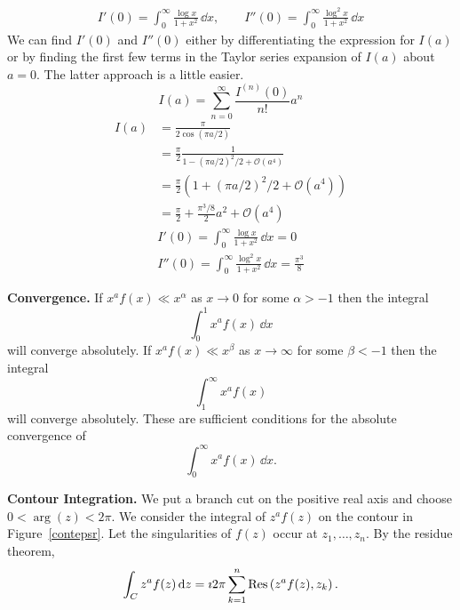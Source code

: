 {\begin{Solution}
\begin{enumerate}
\begin{gather*}
      I'(0) = \int_0^\infty \frac{\log x}{1+x^2}\,\dd x, \qquad
      I''(0) = \int_0^\infty \frac{\log^2 x}{1+x^2}\,\dd x
    \end{gather*}
    We can find $I'(0)$ and $I''(0)$ either by differentiating the
    expression for $I(a)$ or by finding the first few terms in the
    Taylor series expansion of $I(a)$ about $a = 0$.  The latter approach
    is a little easier.
    \[
    I(a) = \sum_{n = 0}^\infty \frac{ I^{(n)}(0) }{ n! } a^n
    \]
    \begin{align*}
      I(a)    &= \frac{\pi}{2 \cos(\pi a / 2)} \\
      &= \frac{\pi}{2} \frac{ 1 }
      { 1 - (\pi a / 2)^2 / 2 + \mathcal{O}( a^4 ) } \\
      &= \frac{\pi}{2} 
      \left( 1 + (\pi a / 2)^2 / 2 + \mathcal{O}( a^4 ) \right) \\
      &= \frac{\pi}{2} + \frac{ \pi^3 / 8 }{2} a^2 
      + \mathcal{O}( a^4 )
    \end{align*}
    \begin{gather*}
      \boxed{
        I'(0) = \int_0^\infty \frac{\log x}{1+x^2} \,\dd x = 0
        } \\
      \boxed{
        I''(0) = \int_0^\infty \frac{\log^2 x}{1+x^2} \,\dd x = \frac{\pi^3}{8}
        }
    \end{gather*}
  \end{enumerate}
\end{Solution}











\begin{Solution}
  \label{solution x^a f(x)}
  \textbf{Convergence.}
  If $x^a f(x) \ll x^\alpha$ as $x \to 0$ for some $\alpha > -1$ then the
  integral
  \[
  \int_0^1 x^a f(x) \,\dd x
  \]
  will converge absolutely.  If $x^a f(x) \ll x^\beta$ as $x \to \infty$ for some
  $\beta < -1$ then the integral
  \[
  \int_1^\infty x^a f(x)
  \]
  will converge absolutely.  These are sufficient conditions for the absolute
  convergence of
  \[
  \int_0^\infty x^a f(x) \,\dd x.
  \]

  \textbf{Contour Integration.}
  We put a branch cut on the positive real axis and choose $0 < \arg(z) < 2 \pi$.
  We consider the integral of $z^a f(z)$ on the contour in Figure~\ref{contepsr}.
  Let the singularities of $f(z)$ occur at $z_1, \ldots, z_n$.
  By the residue theorem,
  \[
  \int_C z^a f(z) \,\mathrm{d} z
  = \imath 2 \pi \sum_{k=1}^n \mathop{\mathrm{Res}}\nolimits \left( z^a f(z), z_k \right).
  \]


\end{Solution}}
